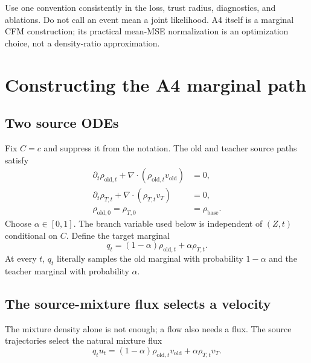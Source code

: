 \documentclass[11pt,a4paper]{article}
\newcommand{\vold}{v_{\mathrm{old}}}
\newcommand{\vT}{v_T}
\theoremstyle{plain}
\theoremstyle{definition}
\begin{document}
\begin{tcolorbox}[colback=yellow!5,colframe=yellow!45!black,title=Scale rule]
Use one convention consistently in the loss, trust radius, diagnostics, and ablations.  Do not
call an event mean a joint likelihood.  A4 itself is a marginal CFM construction; its practical
mean-MSE normalization is an optimization choice, not a density-ratio approximation.
\end{tcolorbox}

\section{Constructing the A4 marginal path}
\label{sec:construction}

\subsection{Two source ODEs}

Fix $C=c$ and suppress it from the notation.  The old and teacher source paths satisfy
\begin{align}
\partial_t\rho_{\mathrm{old},t}
+\nabla\!\cdot(\rho_{\mathrm{old},t}\vold)&=0,
\nonumber\\
\partial_t\rho_{T,t}
+\nabla\!\cdot(\rho_{T,t}\vT)&=0,
\label{eq:source-continuity}\\
\rho_{\mathrm{old},0}=\rho_{T,0}
&=\rho_{\mathrm{base}}.
\nonumber
\end{align}
Choose $\alpha\in[0,1]$.  The branch variable used below is independent of $(Z,t)$ conditional on
$C$.  Define the target marginal
\begin{equation}
q_t
=(1-\alpha)\rho_{\mathrm{old},t}
+\alpha\rho_{T,t}.
\label{eq:a4-q}
\end{equation}
At every $t$, $q_t$ literally samples the old marginal with probability $1-\alpha$ and the
teacher marginal with probability $\alpha$.

\subsection{The source-mixture flux selects a velocity}

The mixture density alone is not enough; a flow also needs a flux.  The source trajectories
select the natural mixture flux
\begin{equation}
q_tu_t
=(1-\alpha)\rho_{\mathrm{old},t}\vold
+\alpha\rho_{T,t}\vT.
\label{eq:a4-flux}
\end{equation}
\end{document}
